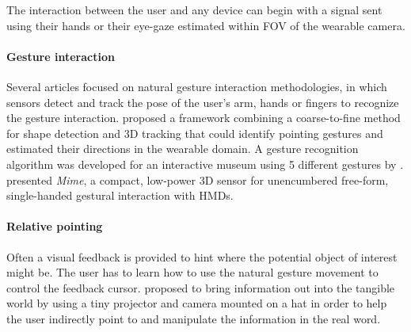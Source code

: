 The interaction between the user and any device can begin with a signal sent using their hands or their eye-gaze estimated within FOV of the wearable camera.

\paragraph{Gesture interaction} Several articles focused on natural gesture interaction methodologies, in which sensors detect and track the pose of the user's arm, hands or fingers to recognize the gesture interaction.
\citet{DeCampos2006} proposed a framework combining a coarse-to-fine method for shape detection and 3D tracking that could identify pointing gestures and estimated their directions in the wearable domain. A gesture recognition algorithm was developed for an interactive museum using 5 different gestures by  \citet{Garcia-Rodriguez2011}. 
\citet{Colaco2013a} presented \textit{Mime}, a compact, low-power 3D sensor for unencumbered free-form, single-handed gestural interaction with HMDs.

\paragraph{Relative pointing} Often a visual feedback is provided to hint where the potential object of interest might be. The user has to learn how to use the natural gesture movement to control the feedback cursor.
\citet{Mistry2009} proposed to bring information out into the tangible world by using a tiny projector and camera mounted on a hat in order to help the user indirectly point to and manipulate the information in the real word.

